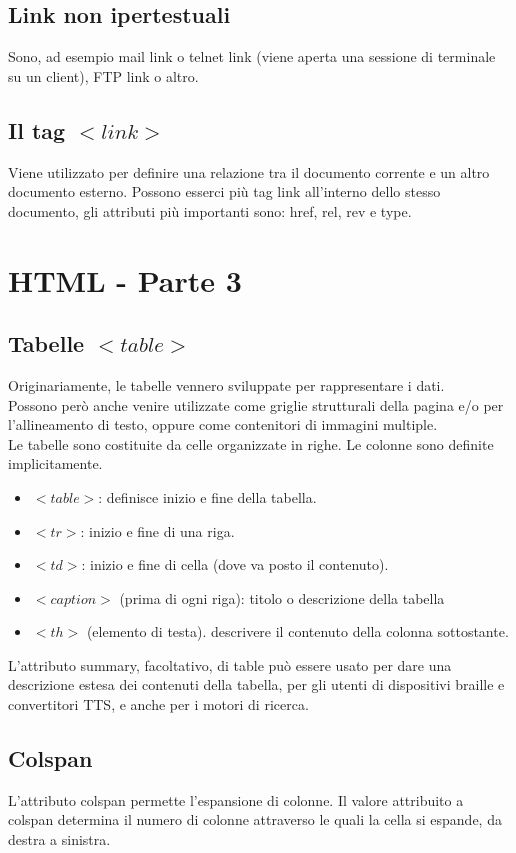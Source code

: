 \documentclass{article}
\begin{document}
\subsection{Link non ipertestuali}
Sono, ad esempio mail link o telnet link (viene aperta una sessione di terminale su un client), FTP link o altro.
\subsection{Il tag $<link>$}
Viene utilizzato per definire una relazione tra il documento corrente e un altro documento esterno. Possono esserci più tag link all'interno dello stesso documento, gli attributi più importanti sono: href, rel, rev e type.
\section{HTML - Parte 3}
\subsection{Tabelle $<table>$}
Originariamente, le tabelle vennero sviluppate per rappresentare i dati.\\
Possono però anche venire utilizzate come griglie strutturali della pagina e/o per l'allineamento di testo, oppure come contenitori di immagini multiple.\\
Le tabelle sono costituite da celle organizzate in righe. Le colonne sono definite implicitamente.\\
\begin{itemize}
	\item $<table>$: definisce inizio e fine della tabella.
	\item $<tr>$: inizio e fine di una riga.
	\item $<td>$: inizio e fine di cella (dove va posto il contenuto).
	\item $<caption>$ (prima di ogni riga): titolo o descrizione della tabella
	\item $<th>$ (elemento di testa). descrivere il contenuto della colonna sottostante.
\end{itemize}
L'attributo summary, facoltativo, di table può essere usato per dare una descrizione estesa dei contenuti della tabella, per gli utenti di dispositivi braille e convertitori TTS, e anche per i motori di ricerca.
\subsection{Colspan}
L'attributo colspan permette l'espansione di colonne. Il valore attribuito a colspan determina il numero di colonne attraverso le quali la cella si espande, da destra a sinistra.
\end{document}
